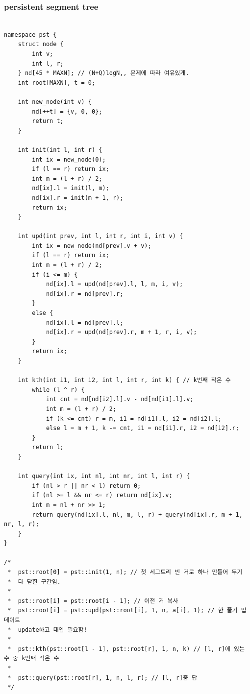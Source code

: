 \documentclass[landscape, 8pt, a4paper, oneside, twocolumn]{extarticle}
\begin{document}
\subsubsection {persistent segment tree}
\begin{verbatim}

namespace pst {
    struct node {
        int v;
        int l, r;
    } nd[45 * MAXN]; // (N+Q)logN,, 문제에 따라 여유있게.
    int root[MAXN], t = 0;

    int new_node(int v) {
        nd[++t] = {v, 0, 0};
        return t;
    }

    int init(int l, int r) {
        int ix = new_node(0);
        if (l == r) return ix;
        int m = (l + r) / 2;
        nd[ix].l = init(l, m);
        nd[ix].r = init(m + 1, r);
        return ix;
    }

    int upd(int prev, int l, int r, int i, int v) {
        int ix = new_node(nd[prev].v + v);
        if (l == r) return ix;
        int m = (l + r) / 2;
        if (i <= m) {
            nd[ix].l = upd(nd[prev].l, l, m, i, v);
            nd[ix].r = nd[prev].r;
        }
        else {
            nd[ix].l = nd[prev].l;
            nd[ix].r = upd(nd[prev].r, m + 1, r, i, v);
        }
        return ix;
    }

    int kth(int i1, int i2, int l, int r, int k) { // k번째 작은 수
        while (l ^ r) {
            int cnt = nd[nd[i2].l].v - nd[nd[i1].l].v;
            int m = (l + r) / 2;
            if (k <= cnt) r = m, i1 = nd[i1].l, i2 = nd[i2].l;
            else l = m + 1, k -= cnt, i1 = nd[i1].r, i2 = nd[i2].r;
        }
        return l;
    }

    int query(int ix, int nl, int nr, int l, int r) {
        if (nl > r || nr < l) return 0;
        if (nl >= l && nr <= r) return nd[ix].v;
        int m = nl + nr >> 1;
        return query(nd[ix].l, nl, m, l, r) + query(nd[ix].r, m + 1, nr, l, r);
    }
}

/*
 *  pst::root[0] = pst::init(1, n); // 첫 세그트리 빈 거로 하나 만들어 두기
 *  다 닫힌 구간임.
 *
 *  pst::root[i] = pst::root[i - 1]; // 이전 거 복사
 *  pst::root[i] = pst::upd(pst::root[i], 1, n, a[i], 1); // 한 줄기 업데이트
 *  update하고 대입 필요함!
 *
 *  pst::kth(pst::root[l - 1], pst::root[r], 1, n, k) // [l, r]에 있는 수 중 k번째 작은 수
 *
 *  pst::query(pst::root[r], 1, n, l, r); // [l, r]중 답
 */

\end{verbatim}
\end{document}
